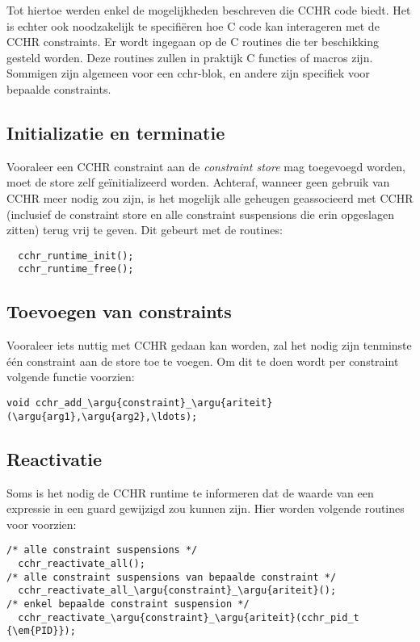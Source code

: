Tot hiertoe werden enkel de mogelijkheden beschreven die CCHR code biedt. Het is echter ook noodzakelijk te specifi\"eren hoe C code kan interageren met de CCHR constraints. Er wordt ingegaan op de C routines die ter beschikking gesteld worden. Deze routines zullen in praktijk C functies of macros zijn. Sommigen zijn algemeen voor een cchr-blok, en andere zijn specifiek voor bepaalde constraints.

\subsection{Initializatie en terminatie}

Vooraleer een CCHR constraint aan de {\em constraint store} mag toegevoegd worden, moet de store zelf ge\"initializeerd worden. Achteraf, wanneer geen gebruik van CCHR meer nodig zou zijn, is het mogelijk alle geheugen geassocieerd met CCHR (inclusief de constraint store en alle constraint suspensions die erin opgeslagen zitten) terug vrij te geven. Dit gebeurt met de routines:
\begin{Verbatim}
  cchr_runtime_init();
  cchr_runtime_free();
\end{Verbatim}

\subsection{Toevoegen van constraints}

Vooraleer iets nuttig met CCHR gedaan kan worden, zal het nodig zijn tenminste \'e\'en constraint aan de store toe te voegen. Om dit te doen wordt per constraint volgende functie voorzien: \begin{Verbatim}[commandchars=\\\{\}]
  void cchr_add_\argu{constraint}_\argu{ariteit}(\argu{arg1},\argu{arg2},\ldots);
\end{Verbatim}

\subsection{Reactivatie}

Soms is het nodig de CCHR runtime te informeren dat de waarde van een expressie in een guard gewijzigd zou kunnen zijn. Hier worden volgende routines voor voorzien: \begin{Verbatim}[commandchars=\\\{\}]
/* alle constraint suspensions */
  cchr_reactivate_all(); 
/* alle constraint suspensions van bepaalde constraint */
  cchr_reactivate_all_\argu{constraint}_\argu{ariteit}();
/* enkel bepaalde constraint suspension */
  cchr_reactivate_\argu{constraint}_\argu{ariteit}(cchr_pid_t {\em{PID}});
\end{Verbatim}

